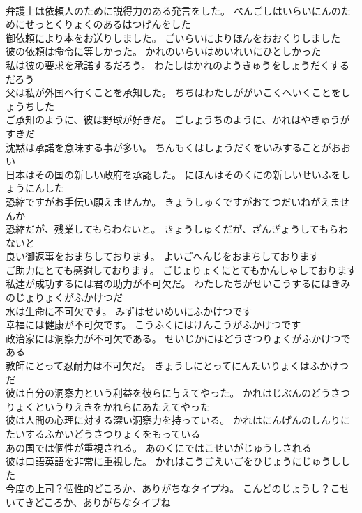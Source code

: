 \documentclass[8pt]{extreport}
\begin{document}
\begin{CJK}{UTF8}{min}
\\	弁護士は依頼人のために説得力のある発言をした。	べんごしはいらいにんのためにせっとくりょくのあるはつげんをした 
\\	御依頼により本をお送りしました。	ごいらいによりほんをおおくりしました 
\\	彼の依頼は命令に等しかった。	かれのいらいはめいれいにひとしかった 
\\	私は彼の要求を承諾するだろう。	わたしはかれのようきゅうをしょうだくするだろう 
\\	父は私が外国へ行くことを承知した。	ちちはわたしががいこくへいくことをしょうちした 
\\	ご承知のように、彼は野球が好きだ。	ごしょうちのように、かれはやきゅうがすきだ 
\\	沈黙は承諾を意味する事が多い。	ちんもくはしょうだくをいみすることがおおい 
\\	日本はその国の新しい政府を承認した。	にほんはそのくにの新しいせいふをしょうにんした 
\\	恐縮ですがお手伝い願えませんか。	きょうしゅくですがおてつだいねがえませんか 
\\	恐縮だが、残業してもらわないと。	きょうしゅくだが、ざんぎょうしてもらわないと 
\\	良い御返事をおまちしております。	よいごへんじをおまちしております 
\\	ご助力にとても感謝しております。	ごじょりょくにとてもかんしゃしております 
\\	私達が成功するには君の助力が不可欠だ。	わたしたちがせいこうするにはきみのじょりょくがふかけつだ 
\\	水は生命に不可欠です。	みずはせいめいにふかけつです 
\\	幸福には健康が不可欠です。	こうふくにはけんこうがふかけつです 
\\	政治家には洞察力が不可欠である。	せいじかにはどうさつりょくがふかけつである 
\\	教師にとって忍耐力は不可欠だ。	きょうしにとってにんたいりょくはふかけつだ 
\\	彼は自分の洞察力という利益を彼らに与えてやった。	かれはじぶんのどうさつりょくというりえきをかれらにあたえてやった 
\\	彼は人間の心理に対する深い洞察力を持っている。	かれはにんげんのしんりにたいするふかいどうさつりょくをもっている 
\\	あの国では個性が重視される。	あのくにではこせいがじゅうしされる 
\\	彼は口語英語を非常に重視した。	かれはこうごえいごをひじょうにじゅうしした 
\\	今度の上司？個性的どころか、ありがちなタイプね。	こんどのじょうし？こせいてきどころか、ありがちなタイプね 

\end{CJK}
\end{document}
